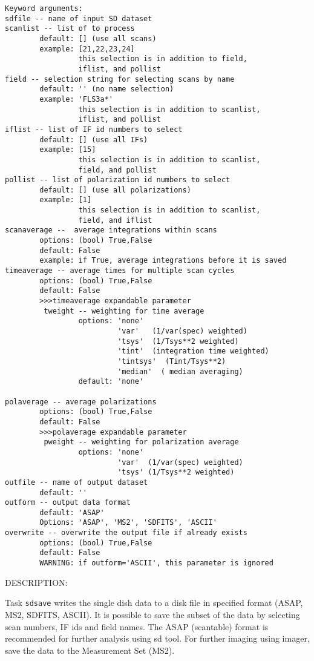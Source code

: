 \begin{verbatim}
Keyword arguments:
sdfile -- name of input SD dataset
scanlist -- list of to process
        default: [] (use all scans)
        example: [21,22,23,24]
                 this selection is in addition to field,
                 iflist, and pollist
field -- selection string for selecting scans by name
        default: '' (no name selection)
        example: 'FLS3a*'
                 this selection is in addition to scanlist,
                 iflist, and pollist
iflist -- list of IF id numbers to select
        default: [] (use all IFs)
        example: [15]
                 this selection is in addition to scanlist,
                 field, and pollist
pollist -- list of polarization id numbers to select
        default: [] (use all polarizations)
        example: [1]
                 this selection is in addition to scanlist,
                 field, and iflist
scanaverage --  average integrations within scans
        options: (bool) True,False
        default: False
        example: if True, average integrations before it is saved
timeaverage -- average times for multiple scan cycles
        options: (bool) True,False
        default: False
        >>>timeaverage expandable parameter
         tweight -- weighting for time average
                 options: 'none'
                          'var'   (1/var(spec) weighted)
                          'tsys'  (1/Tsys**2 weighted)
                          'tint'  (integration time weighted)
                          'tintsys'  (Tint/Tsys**2)
                          'median'  ( median averaging)
                 default: 'none'

polaverage -- average polarizations
        options: (bool) True,False
        default: False
        >>>polaverage expandable parameter
         pweight -- weighting for polarization average
                 options: 'none'
                          'var'  (1/var(spec) weighted)
                          'tsys' (1/Tsys**2 weighted)
outfile -- name of output dataset
        default: ''
outform -- output data format
        default: 'ASAP'
        Options: 'ASAP', 'MS2', 'SDFITS', 'ASCII'
overwrite -- overwrite the output file if already exists
        options: (bool) True,False
        default: False
        WARNING: if outform='ASCII', this parameter is ignored
\end{verbatim}

          DESCRIPTION:

          Task {\tt sdsave} writes the single dish data to a disk file in 
          specified format (ASAP, MS2, SDFITS, ASCII). It is possible to
          save the subset of the data by selecting scan numbers, IF ids
          and field names. The ASAP (scantable) format is recommended for
          further analysis using sd tool. For further imaging using imager,
          save the data to the Measurement Set (MS2).
    


